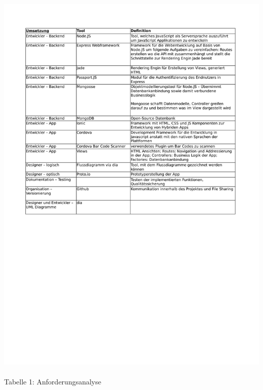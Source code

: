 \documentclass[12pt,a4paper]{article}
\begin{document}
\hspace*{-10mm} \includegraphics[trim = 17mm 130mm 0mm 20mm]{Anforderungskatalog.pdf}
\\
\\
\footnotesize Tabelle 1: Anforderungsanalyse
\normalsize
\\
\newpage
\end{document}
